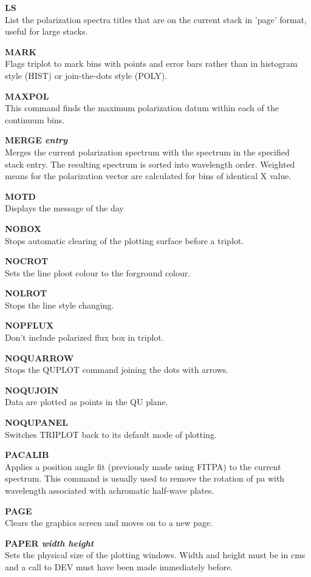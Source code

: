 \documentclass[11pt,nolof,noabs]{starlink}
\begin{document}
\textbf{LS} \\
List the polarization spectra titles that are on the current stack in
'page' format, useful for large stacks.

\textbf{MARK} \\
Flags triplot to mark bins with points and error bars rather than in
histogram style (HIST) or join-the-dots style (POLY).

\textbf{MAXPOL} \\
This command finds the maximum polarization datum within each of the
continuum bins.

\textbf{MERGE \it entry} \\
Merges the current polarization spectrum with the spectrum in the specified
stack entry. The resulting spectrum is sorted into wavelength order. Weighted
means for the polarization vector are calculated for bins of identical X value.

\textbf{MOTD} \\
Displays the message of the day

\textbf{NOBOX} \\
Stops automatic clearing of the plotting surface before a triplot.

\textbf{NOCROT} \\
Sets the line ploot colour to the forground colour.

\textbf{NOLROT} \\
Stops the line style changing.

\textbf{NOPFLUX} \\
Don't include polarized flux box in triplot.

\textbf{NOQUARROW} \\
Stops the QUPLOT command joining the dots with arrows.

\textbf{NOQUJOIN} \\
Data are plotted as points in the QU plane.

\textbf{NOQUPANEL} \\
Switches TRIPLOT back to its default mode of plotting.

\textbf{PACALIB} \\
Applies a position angle fit (previously made using FITPA) to the current
spectrum. This command is usually used to remove the rotation of pa with
wavelength associated with achromatic half-wave plates.

\textbf{PAGE} \\
Clears the graphics screen and moves on to a new page.

\textbf{PAPER \it width height} \\
Sets the physical size of the plotting windows. Width and height must be
in cms and a call to DEV must have been made immediately before.
\end{document}
